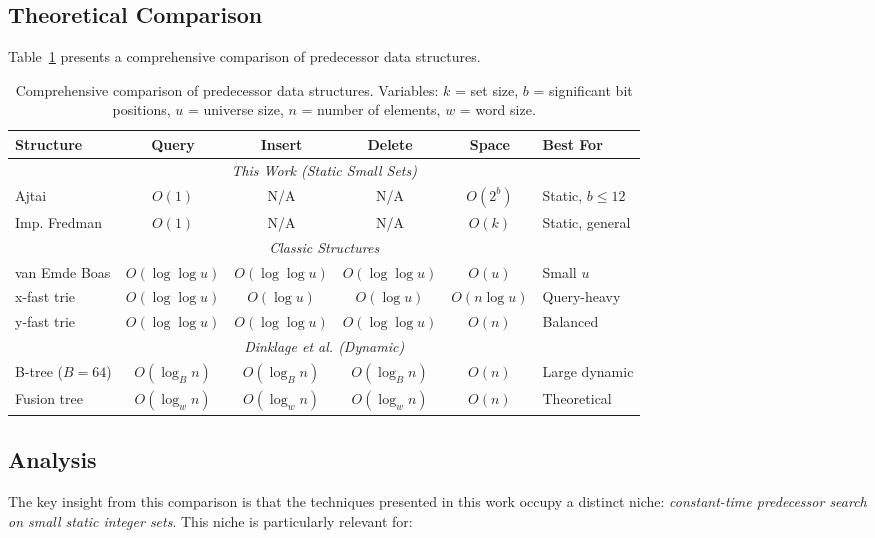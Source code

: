 \subsection{Theoretical Comparison}

Table~\ref{tab:comprehensive-comparison} presents a comprehensive comparison of predecessor data structures.

\begin{table}[H]
\centering
\small
\begin{tabular}{|l|c|c|c|c|l|}
\hline
\textbf{Structure} & \textbf{Query} & \textbf{Insert} & \textbf{Delete} & \textbf{Space} & \textbf{Best For} \\
\hline
\multicolumn{6}{|c|}{\textit{This Work (Static Small Sets)}} \\
\hline
Ajtai & $O(1)$ & N/A & N/A & $O(2^b)$ & Static, $b \leq 12$ \\
Imp. Fredman & $O(1)$ & N/A & N/A & $O(k)$ & Static, general \\
\hline
\multicolumn{6}{|c|}{\textit{Classic Structures}} \\
\hline
van Emde Boas & $O(\log\log u)$ & $O(\log\log u)$ & $O(\log\log u)$ & $O(u)$ & Small $u$ \\
x-fast trie & $O(\log\log u)$ & $O(\log u)$ & $O(\log u)$ & $O(n\log u)$ & Query-heavy \\
y-fast trie & $O(\log\log u)$ & $O(\log\log u)$ & $O(\log\log u)$ & $O(n)$ & Balanced \\
\hline
\multicolumn{6}{|c|}{\textit{Dinklage et al. (Dynamic)}} \\
\hline
B-tree ($B=64$) & $O(\log_B n)$ & $O(\log_B n)$ & $O(\log_B n)$ & $O(n)$ & Large dynamic \\
Fusion tree & $O(\log_w n)$ & $O(\log_w n)$ & $O(\log_w n)$ & $O(n)$ & Theoretical \\
\hline
\end{tabular}
\caption{Comprehensive comparison of predecessor data structures. Variables: $k$ = set size, $b$ = significant bit positions, $u$ = universe size, $n$ = number of elements, $w$ = word size.}
\label{tab:comprehensive-comparison}
\end{table}

\subsection{Analysis}

The key insight from this comparison is that the techniques presented in this work occupy a distinct niche: \textit{constant-time predecessor search on small static integer sets}. This niche is particularly relevant for:

